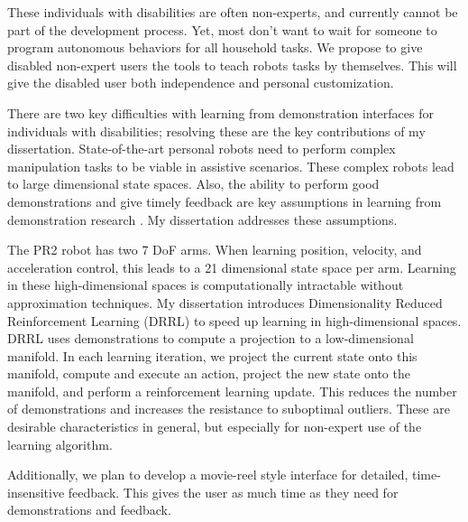 \documentclass[letterpaper]{article}
\begin{document}
These individuals with disabilities are often non-experts, and currently cannot be part of the development process. Yet, most don't want to wait for someone to program autonomous behaviors for all household tasks. We propose to give disabled non-expert users the tools to teach robots tasks by themselves. This will give the disabled user both independence and personal customization.

There are two key difficulties with learning from demonstration interfaces for individuals with disabilities; resolving these are the key contributions of my dissertation. State-of-the-art personal robots need to perform complex manipulation tasks to be viable in assistive scenarios. These complex robots lead to large dimensional state spaces. Also, the ability to perform good demonstrations and give timely feedback are key assumptions in learning from demonstration research \cite{Argall:2009:SRL:1523530.1524008}. My dissertation addresses these assumptions.

The PR2 robot has two 7 DoF arms. When learning position, velocity, and acceleration control, this leads to a 21 dimensional state space per arm. Learning in these high-dimensional spaces is computationally intractable without approximation techniques.  My dissertation introduces Dimensionality Reduced Reinforcement Learning (DRRL) to speed up learning in high-dimensional spaces. DRRL uses demonstrations to compute a projection to a low-dimensional manifold.  In each learning iteration, we project the current state onto this manifold, compute and execute an action, project the new state onto the manifold, and perform a reinforcement learning update. This reduces the number of demonstrations and increases the resistance to suboptimal outliers. These are desirable characteristics in general, but especially for non-expert use of the learning algorithm.

Additionally, we plan to develop a movie-reel style interface for detailed, time-insensitive feedback. This gives the user as much time as they need for demonstrations and feedback.


\end{document}
